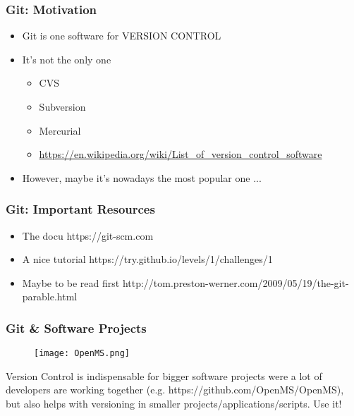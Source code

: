 \documentclass{beamer} %
\begin{document}
\begin{frame}[t]
\frametitle{Git: Motivation}
\begin{itemize}
    \setlength\itemsep{1em}
	\item Git is one software for VERSION CONTROL \newline
    \item It's not the only one
    
	\begin{itemize}
    	\setlength\itemsep{0.4em}
		\item CVS
        \item Subversion
        \item Mercurial
        \item \href{https://en.wikipedia.org/wiki/List_of_version_control_software}{https://en.wikipedia.org/wiki/List\_of\_version\_control\_software} 
	\end{itemize}
    
    \item However, maybe it's nowadays the most popular one ...
    
\end{itemize}
\end{frame}

\begin{frame}[t]
\frametitle{Git: Important Resources}
\begin{itemize}
    \setlength\itemsep{1em}
	\item The docu \newline https://git-scm.com \newline
    \item A nice tutorial \newline https://try.github.io/levels/1/challenges/1 \newline
    \item Maybe to be read first \newline http://tom.preston-werner.com/2009/05/19/the-git-parable.html \newline
\end{itemize}
\end{frame}

\begin{frame}[t]
\frametitle{Git \& Software Projects}
\begin{figure}
    \begin{center}
    	\texttt{[image: OpenMS.png]}
    \end{center}
\end{figure} 

Version Control is indispensable for bigger software projects were a lot of developers are working together (e.g. https://github.com/OpenMS/OpenMS), but also helps with versioning in smaller projects/applications/scripts. Use it! 
\end{frame}
\end{document}
